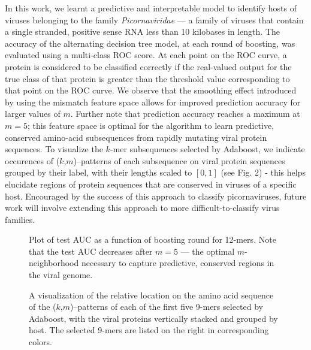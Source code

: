 In this work, we learnt a predictive and interpretable model to identify hosts of viruses 
belonging to the family \emph{Picornaviridae} --- a family of viruses that contain a single 
stranded, positive sense RNA less than 10 kilobases in length. The accuracy of the alternating 
decision tree model, at each round of boosting, was evaluated using a multi-class ROC score.
At each point on the ROC curve, a protein is considered to be classified correctly if the 
real-valued output for the true class of that protein is greater than the threshold value
corresponding to that point on the ROC curve. We observe that the smoothing effect introduced
by using the mismatch feature space allows for improved prediction accuracy for larger
values of $m$. Further note that prediction accuracy reaches a maximum at $m=5$; this feature space is
optimal for the algorithm to learn predictive, conserved amino-acid subsequences from rapidly 
mutating viral protein sequences. To visualize the $k$-mer subsequences selected by 
Adaboost, we indicate occurences of ($k$,$m$)--patterns of each subsequence on viral protein 
sequences grouped by their label, with their lengths scaled to $[0,1]$ (see Fig. 2) - this helps 
elucidate regions of protein sequences that are conserved in viruses of a specific host. Encouraged 
by the success of this approach to classify picornaviruses, future work will involve extending 
this approach to more difficult-to-classify virus families.

\begin{figure}
\begin{minipage}[t]{0.5\linewidth}
\caption{\small{Plot of test AUC as a function of boosting round for 12-mers. Note that the test AUC decreases
after $m=5$ --- the optimal $m$-neighborhood necessary to capture predictive, conserved regions
in the viral genome.}}
\label{auc}
\end{minipage}\quad
\begin{minipage}[t]{0.5\linewidth}
\caption{\small{A visualization of the relative location on the amino acid sequence of the 
($k$,$m$)--patterns of each of the first five 9-mers selected by Adaboost, with the viral proteins
vertically stacked and grouped by host. The selected 9-mers are listed on the right in corresponding colors.}}
\label{kmers}
\end{minipage}
\end{figure}


